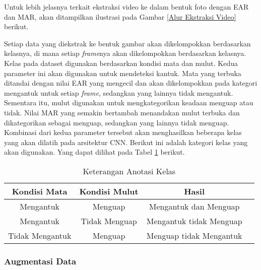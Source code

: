     Untuk lebih jelasnya terkait ekstraksi video ke dalam bentuk foto dengan EAR dan MAR, akan ditampilkan ilustrasi pada Gambar \ref{Alur Ekstraksi Video} berikut.
    
  

    

    

    
    Setiap data yang diekstrak ke bentuk gambar akan dikelompokkan berdasarkan kelasnya, di mana setiap \textit{frame}nya akan dikelompokkan berdasarkan kelasnya. Kelas pada dataset digunakan berdasarkan kondisi mata dan mulut. Kedua parameter ini akan digunakan untuk mendeteksi kantuk. Mata yang terbuka ditandai dengan nilai EAR yang mengecil dan akan dikelompokkan pada kategori mengantuk untuk setiap \textit{frame}, sedangkan yang lainnya tidak mengantuk. Sementara itu, mulut digunakan untuk mengkategorikan keadaan menguap atau tidak. Nilai MAR yang semakin bertambah menandakan mulut terbuka dan dikategorikan sebagai menguap, sedangkan yang lainnya tidak menguap. Kombinasi dari kedua parameter tersebut akan menghasilkan beberapa kelas yang akan dilatih pada arsitektur CNN. Berikut ini adalah kategori kelas yang akan digunakan. Yang dapat dilihat pada Tabel \ref{Keterangan Anotasi Kelas} berikut.


    
    \begin{table}[h]
        \centering
        \caption{Keterangan Anotasi Kelas}
        \begin{tabular}{cccc}
            \hline
            \textbf{Kondisi Mata} & \textbf{Kondisi Mulut} & \textbf{Hasil} \\
            \midrule Mengantuk & Menguap &  Mengantuk dan Menguap\\
                     Mengantuk & Tidak Menguap &  Mengantuk tidak Menguap \\
                     Tidak Mengantuk & Menguap &  Menguap tidak Mengantuk\\
                
        
            \bottomrule
        \end{tabular}
        \label{Keterangan Anotasi Kelas}
    \end{table}
    

\subsubsection{Augmentasi Data}

